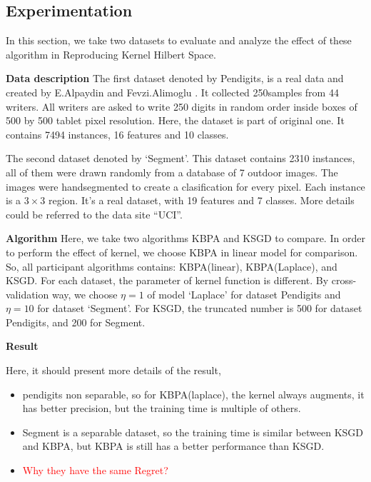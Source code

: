 \subsection{Experimentation}

In this section, we take two datasets to evaluate and analyze the effect of these algorithm in Reproducing Kernel Hilbert Space.

\textbf{Data description}
The first dataset denoted by Pendigits, is a real data and created by E.Alpaydin and Fevzi.Alimoglu \cite{alimoglu1996combining,Alimoglu96methodsof}. 
It  collected 250samples from 44 writers. All writers are asked to write 250 digits in random order inside boxes of 500 by 500 tablet pixel resolution. 
Here, the dataset is part of original one. It contains 7494 instances, 16 features and 10 classes. 

The second dataset denoted by `Segment'\cite{Lichman:2013}. This dataset contains 2310 instances, all of them were drawn randomly from a database of 7 outdoor images. The images were handsegmented to create a clasification for every pixel. Each instance is a $3\times 3$ region. It's a real dataset, with 19 features and 7 classes. More details could be referred to the data site ``UCI''.


\textbf{Algorithm}
Here, we take two algorithms KBPA and KSGD to compare. In order to perform the effect of kernel, we choose KBPA in linear model for comparison. So, all participant algorithms contains: KBPA(linear), KBPA(Laplace), and KSGD. For each dataset, the parameter of kernel function is different. By cross-validation way, we choose $\eta = 1$ of model `Laplace' for dataset Pendigits and $\eta = 10$ for dataset `Segment'. For KSGD, the truncated number is 500 for dataset Pendigits, and 200 for Segment.

\textbf{Result}

Here, it should present more details of the result, 
\begin{itemize}
\item	pendigits non separable, so for KBPA(laplace), the kernel always augments, it has better precision, but the training time is multiple of others.
\item	Segment is a separable dataset, so the training time is similar between KSGD and KBPA, but KBPA is still has a better performance than KSGD. 
\item \textcolor{red}{Why they have the same Regret?}
\end{itemize}


